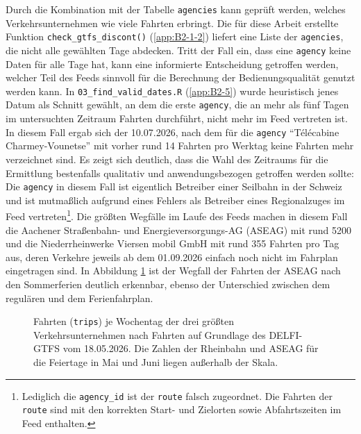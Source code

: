 \documentclass[11pt,pdftex,a4paper]{scrartcl}
\begin{document}
	Durch die Kombination mit der Tabelle \texttt{agencies} kann geprüft werden, welches Verkehrsunternehmen wie viele Fahrten erbringt. Die für diese Arbeit erstellte Funktion \texttt{check\_gtfs\_discont()} (\ref{app:B2-1-2}) liefert eine Liste der \texttt{agencies}, die nicht alle gewählten Tage abdecken. Tritt der Fall ein, dass eine \texttt{agency} keine Daten für alle Tage hat, kann eine informierte Entscheidung getroffen werden, welcher Teil des Feeds sinnvoll für die Berechnung der Bedienungsqualität genutzt werden kann. In \texttt{03\_find\_valid\_dates.R} (\ref{app:B2-5}) wurde heuristisch jenes Datum als Schnitt gewählt, an dem die erste \texttt{agency}, die an mehr als fünf Tagen im untersuchten Zeitraum Fahrten durchführt, nicht mehr im Feed vertreten ist. In diesem Fall ergab sich der 10.07.2026, nach dem für die \texttt{agency} \enquote{Télécabine Charmey-Vounetse} mit vorher rund \num{14} Fahrten pro Werktag keine Fahrten mehr verzeichnet sind. Es zeigt sich deutlich, dass die Wahl des Zeitraums für die Ermittlung bestenfalls qualitativ und anwendungsbezogen getroffen werden sollte: Die \texttt{agency} in diesem Fall ist eigentlich Betreiber einer Seilbahn in der Schweiz \parencite[vgl.][]{regionfreiburgBergbahnenCharmey} und ist mutmaßlich aufgrund eines Fehlers als Betreiber eines Regionalzuges im Feed vertreten\footnote{Lediglich die \texttt{agency\_id} ist der \texttt{route} falsch zugeordnet. Die Fahrten der \texttt{route} sind mit den korrekten Start- und Zielorten sowie Abfahrtszeiten im Feed enthalten.}. Die größten Wegfälle im Laufe des Feeds machen in diesem Fall die Aachener Straßenbahn- und Energieversorgungs-AG (ASEAG) mit rund \num{5200} und die Niederrheinwerke Viersen mobil GmbH mit rund \num{355} Fahrten pro Tag aus, deren Verkehre jeweils ab dem 01.09.2026 einfach noch nicht im Fahrplan eingetragen sind. In Abbildung \ref{fig:tripsyearperagency2026-05-18} ist der Wegfall der Fahrten der ASEAG nach den Sommerferien deutlich erkennbar, ebenso der Unterschied zwischen dem regulären und dem Ferienfahrplan. 
	
\begin{figure}[ht]
	\centering
	\caption[\texttt{trips} je Wochentag der drei größten Verkehrsunternehmen auf Grundlage des DELFI-GTFS vom 18.05.2026]{Fahrten (\texttt{trips}) je Wochentag der drei größten Verkehrsunternehmen nach Fahrten auf Grundlage des DELFI-GTFS vom 18.05.2026. Die Zahlen der Rheinbahn und ASEAG für die Feiertage in Mai und Juni liegen außerhalb der Skala.}
	
	\label{fig:tripsyearperagency2026-05-18}
\end{figure}
\end{document}
